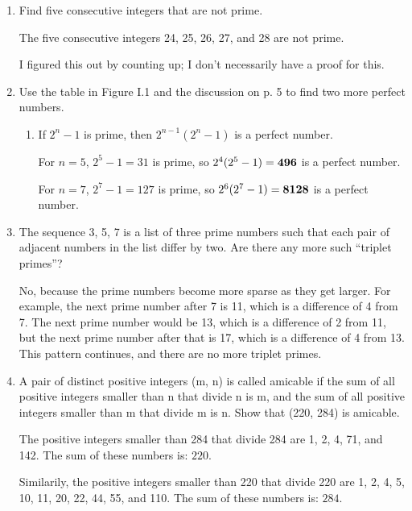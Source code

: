 \documentclass[12pt]{exam}
\begin{document}
\begin{enumerate} [listparindent=1.5em]
\begin{enumerate}
$m = 2 \cdot 3 \cdot 5 \cdot 7 + 1 = 211$

\item Use this method to find a prime different from 2, 5, and 11.


With the same formula, you get

$m = 2 \cdot 5 \cdot 11 + 1 = 111$.
\end{enumerate}

\item Find five consecutive integers that are not prime.


The five consecutive integers 24, 25, 26, 27, and 28 are not prime.

I figured this out by counting up; I don't necessarily have a proof for this. 

\item Use the table in Figure I.1 and the discussion on p. 5 to find two more
perfect numbers.
\begin{enumerate}
\item If $2^{n} - 1$ is prime, then $2^{n-1}(2^{n} - 1)$ is a perfect number.

For $n = 5$, $2^{5} - 1 = 31$ is prime, so $2^{4}(2^{5} - 1) = \bf{496}$ is a perfect number.

For $n = 7$, $2^{7} - 1 = 127$ is prime, so $2^{6}(2^{7} - 1) = \bf{8128}$ is a perfect number.

\end{enumerate}

\item The sequence 3, 5, 7 is a list of three prime numbers such that each
pair of adjacent numbers in the list differ by two. Are there any more
such “triplet primes”?

    No, because the prime numbers become more sparse as they get larger. For example, the next prime number after 7 is 11, which is a difference of 4 from 7. The next prime number would be 13, which is a difference of 2 from 11, but the next prime number after that is 17, which is a difference of 4 from 13. This pattern continues, and there are no more triplet primes.

\item A pair of distinct positive integers (m, n) is called amicable if the sum of all positive integers smaller than n that divide n is m, and the sum of all positive integers smaller than m that divide m is n. Show that (220, 284) is amicable.

The positive integers smaller than 284 that divide 284 are 1, 2, 4, 71, and 142. The sum of these numbers is: $220$.

Similarily, the positive integers smaller than 220 that divide 220 are 1, 2, 4, 5, 10, 11, 20, 22, 44, 55, and 110. The sum of these numbers is: $284$.
\end{enumerate}
\end{document}
